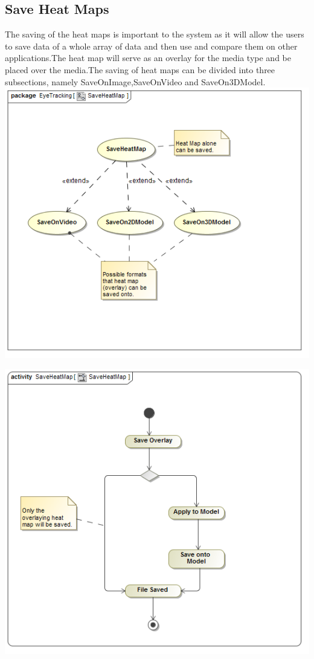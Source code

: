 \subsection{Save Heat Maps}
	The saving of the heat maps is important to the system as it will allow the users to save data of a whole array of data and then use and compare them on other applications.The heat map will serve as an overlay for the media type and be placed over the media.The saving of heat maps can be divided into three subsections, namely SaveOnImage,SaveOnVideo and SaveOn3DModel.
	\newline
	\includegraphics[scale=0.5]{Diagrams/Use_Case_Diagram__SaveHeatMap.png}\newline
		
	\includegraphics[scale=0.5]{Diagrams/Activity_Diagram__SaveHeatMap__SaveHeatMap.png}	
	
